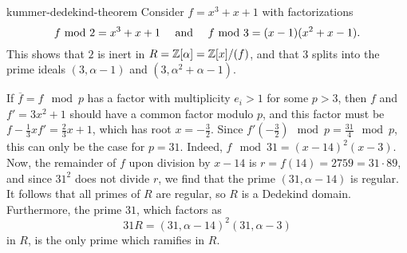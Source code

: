 \begin{example}{kummer-dedekind-theorem}
    Consider $f = x^3 + x + 1$ with factorizations
    \[ f \mod 2 = x^3 + x + 1 \quad \textup{ and } \quad f \mod 3 = (x - 1)(x^2 + x - 1) . \]
    This shows that $2$ is inert in $R = \ZZ[\alpha] = \ZZ[x] / (f)$, and that $3$ splits into the prime ideals $(3, \alpha - 1)$ and $(3, \alpha^2 + \alpha - 1)$.
    
    If $\overline{f} = f \mod p$ has a factor with multiplicity $e_i > 1$ for some $p > 3$, then $f$ and $f' = 3x^2 + 1$ should have a common factor modulo $p$, and this factor must be $f - \tfrac{1}{3} x f' = \tfrac{2}{3} x + 1$, which has root $x = - \tfrac{3}{2}$. Since $f'(-\tfrac{3}{2}) \mod p = \tfrac{31}{4} \mod p$, this can only be the case for $p = 31$. Indeed, $f \mod 31 = (x - 14)^2 (x - 3)$. Now, the remainder of $f$ upon division by $x - 14$ is $r = f(14) = 2759 = 31 \cdot 89$, and since $31^2$ does not divide $r$, we find that the prime $(31, \alpha - 14)$ is regular. It follows that all primes of $R$ are regular, so $R$ is a Dedekind domain. Furthermore, the prime $31$, which factors as
    \[ 31 R = (31, \alpha - 14)^2 (31, \alpha - 3) \]
    in $R$, is the only prime which ramifies in $R$.
\end{example}
